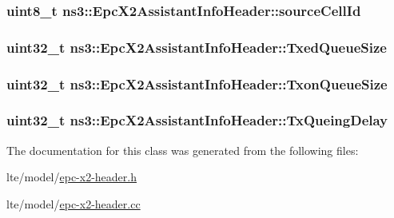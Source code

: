 \subsubsection[{\texorpdfstring{source\+Cell\+Id}{sourceCellId}}]{\setlength{\rightskip}{0pt plus 5cm}uint8\+\_\+t ns3\+::\+Epc\+X2\+Assistant\+Info\+Header\+::source\+Cell\+Id\hspace{0.3cm}{\ttfamily [private]}}\hypertarget{classns3_1_1EpcX2AssistantInfoHeader_abad5c80790df2ba30a2965b92d4980ef}{}\label{classns3_1_1EpcX2AssistantInfoHeader_abad5c80790df2ba30a2965b92d4980ef}
\subsubsection[{\texorpdfstring{Txed\+Queue\+Size}{TxedQueueSize}}]{\setlength{\rightskip}{0pt plus 5cm}uint32\+\_\+t ns3\+::\+Epc\+X2\+Assistant\+Info\+Header\+::\+Txed\+Queue\+Size\hspace{0.3cm}{\ttfamily [private]}}\hypertarget{classns3_1_1EpcX2AssistantInfoHeader_aa2a81acf2b583acc011d68ef3e232e3a}{}\label{classns3_1_1EpcX2AssistantInfoHeader_aa2a81acf2b583acc011d68ef3e232e3a}
\subsubsection[{\texorpdfstring{Txon\+Queue\+Size}{TxonQueueSize}}]{\setlength{\rightskip}{0pt plus 5cm}uint32\+\_\+t ns3\+::\+Epc\+X2\+Assistant\+Info\+Header\+::\+Txon\+Queue\+Size\hspace{0.3cm}{\ttfamily [private]}}\hypertarget{classns3_1_1EpcX2AssistantInfoHeader_a0c758716c881b7aabbb59f47fb4de1f9}{}\label{classns3_1_1EpcX2AssistantInfoHeader_a0c758716c881b7aabbb59f47fb4de1f9}
\subsubsection[{\texorpdfstring{Tx\+Queing\+Delay}{TxQueingDelay}}]{\setlength{\rightskip}{0pt plus 5cm}uint32\+\_\+t ns3\+::\+Epc\+X2\+Assistant\+Info\+Header\+::\+Tx\+Queing\+Delay\hspace{0.3cm}{\ttfamily [private]}}\hypertarget{classns3_1_1EpcX2AssistantInfoHeader_a9c1dab3b089d70b7e138ae84faed72b5}{}\label{classns3_1_1EpcX2AssistantInfoHeader_a9c1dab3b089d70b7e138ae84faed72b5}


The documentation for this class was generated from the following files\+:\begin{DoxyCompactItemize}
\item 
lte/model/\hyperlink{epc-x2-header_8h}{epc-\/x2-\/header.\+h}\item 
lte/model/\hyperlink{epc-x2-header_8cc}{epc-\/x2-\/header.\+cc}\end{DoxyCompactItemize}
